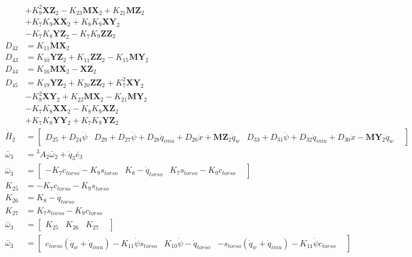 \begin{align}
&+ K_{9}^2\mathbf{XZ}_2 - K_{23}\mathbf{MX}_2 + K_{21}\mathbf{MZ}_2  \nonumber \\
&+ K_{7}K_{9}\mathbf{XX}_2 + K_{8}K_{9}\mathbf{XY}_2  \nonumber \\
&- K_{7}K_{8}\mathbf{YZ}_2 - K_{7}K_{9}\mathbf{ZZ}_2 \nonumber \\
D_{42} &= K_{11}\mathbf{MX}_2 \nonumber \\
D_{43} &= K_{10}\mathbf{YZ}_2 + K_{11}\mathbf{ZZ}_2 - K_{15}\mathbf{MY}_2 \nonumber \\
D_{44} &= K_{16}\mathbf{MX}_2 - \mathbf{XZ}_2 \nonumber \\
D_{45} &= K_{19}\mathbf{YZ}_2 + K_{20}\mathbf{ZZ}_2 + K_{7}^2\mathbf{XY}_2  \nonumber \\
&- K_{8}^2\mathbf{XY}_2 + K_{22}\mathbf{MX}_2 - K_{21}\mathbf{MY}_2  \nonumber \\
&- K_{7}K_{8}\mathbf{XX}_2 - K_{8}K_{9}\mathbf{XZ}_2  \nonumber \\
&+ K_{7}K_{8}\mathbf{YY}_2 + K_{7}K_{9}\mathbf{YZ}_2 \nonumber \\
 \dot{\bar{H}}_{2} &= \left[\begin{matrix} D_{25} + D_{24}\ddot{\psi} & D_{29} + D_{27}\ddot{\psi} + D_{28}\ddot{q}_{imu} + D_{26}\ddot{x} + \mathbf{MZ}_2\ddot{q}_{w} & D_{33} + D_{31}\ddot{\psi} + D_{32}\ddot{q}_{imu} + D_{30}\ddot{x} - \mathbf{MY}_2\ddot{q}_{w} &  \end{matrix}\right] 
 \nonumber \\ 
 \bar\omega_{3} &= {}^{3}A_{2} \bar\omega_{2} + \dot{q}_{3} \bar{e}_{3} 
 \nonumber \\ 
 \bar\omega_{3} &= \left[\begin{matrix} - K_{7}c_{torso} - K_{9}s_{torso} & K_{8} - \dot{q}_{torso} & K_{7}s_{torso} - K_{9}c_{torso} &  \end{matrix}\right] 
 \nonumber \\ 
K_{25} &= - K_{7}c_{torso} - K_{9}s_{torso} \nonumber \\
K_{26} &= K_{8} - \dot{q}_{torso} \nonumber \\
K_{27} &= K_{7}s_{torso} - K_{9}c_{torso} \nonumber \\
 \bar\omega_{3} &= \left[\begin{matrix} K_{25} & K_{26} & K_{27} &  \end{matrix}\right] 
 \nonumber \\ 
 \bar\omega_{3} &= \left[\begin{matrix} c_{torso}(\dot{q}_{w} + \dot{q}_{imu}) - K_{11}\dot{\psi}s_{torso} & K_{10}\dot{\psi} - \dot{q}_{torso} & - s_{torso}(\dot{q}_{w} + \dot{q}_{imu}) - K_{11}\dot{\psi}c_{torso} &  \end{matrix}\right] 

\end{align}
